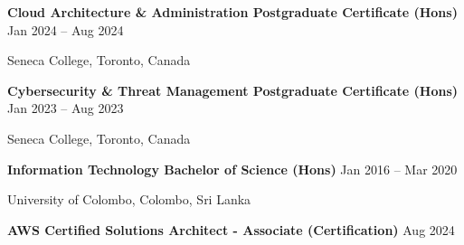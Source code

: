 \documentclass[10pt,letterpaper]{article}
\begin{document}
\vspace{-2pt}

\textbf{Cloud Architecture \& Administration Postgraduate Certificate (Hons)} \hfill Jan 2024 -- Aug 2024

Seneca College, Toronto, Canada

\textbf{Cybersecurity \& Threat Management Postgraduate Certificate (Hons)} \hfill Jan 2023 -- Aug 2023

Seneca College, Toronto, Canada

\textbf{Information Technology Bachelor of Science (Hons)} \hfill Jan 2016 -- Mar 2020

University of Colombo, Colombo, Sri Lanka

\textbf{AWS Certified Solutions Architect - Associate (Certification)} \hfill Aug 2024
\end{document}
